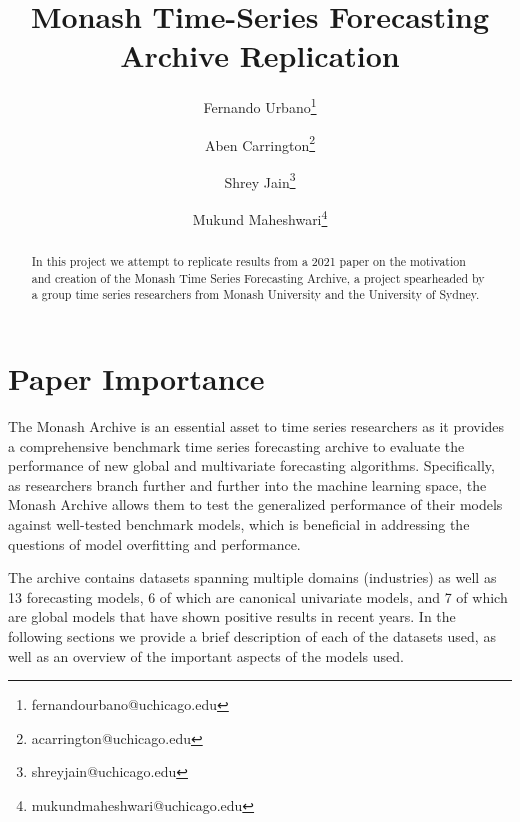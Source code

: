 \newcommand*{\MyHeaderPath}{.}%
\newcommand*{\PathToAssets}{../assets}%
\newcommand*{\PathToOutput}{../output/}%
\newcommand*{\PathToOutputTables}{../output/tables}%









\begin{titlepage}
\title{Monash Time-Series Forecasting Archive Replication}
\author{
    Fernando Urbano\footnote{fernandourbano@uchicago.edu} \and
    Aben Carrington\footnote{acarrington@uchicago.edu} \and
    Shrey Jain\footnote{shreyjain@uchicago.edu} \and
    Mukund Maheshwari\footnote{mukundmaheshwari@uchicago.edu}
}
\maketitle

\doublespacing
\begin{abstract}
In this project we attempt to replicate results from a 2021 paper on the motivation and creation of the Monash Time Series Forecasting Archive, a project spearheaded by a group time series researchers from Monash University and the University of Sydney.

\end{abstract}
\end{titlepage}

\section{Paper Importance}
The Monash Archive is an essential asset to time series researchers as it provides a comprehensive benchmark time series forecasting archive to evaluate the performance of new global and multivariate forecasting algorithms. Specifically, as researchers branch further and further into the machine learning space, the Monash Archive allows them to test the generalized performance of their models against well-tested benchmark models, which is beneficial in addressing the questions of model overfitting and performance. 

The archive contains datasets spanning multiple domains (industries) as well as 13 forecasting models, 6 of which are canonical univariate models, and 7 of which are global models that have shown positive results in recent years. In the following sections we provide a brief description of each of the datasets used, as well as an overview of the important aspects of the models used. 

